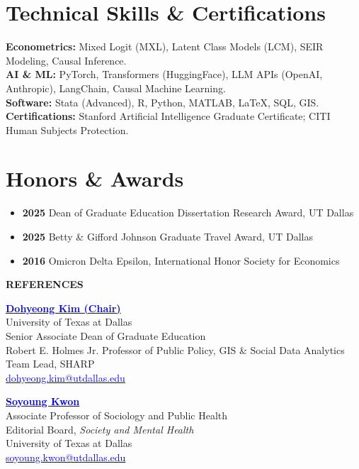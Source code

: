 \documentclass[11pt, letterpaper]{article}
\begin{document}
\section*{Technical Skills \& Certifications}
\textbf{Econometrics:} Mixed Logit (MXL), Latent Class Models (LCM), SEIR Modeling, Causal Inference. \\
\textbf{AI \& ML:} PyTorch, Transformers (HuggingFace), LLM APIs (OpenAI, Anthropic), LangChain, Causal Machine Learning. \\
\textbf{Software:} Stata (Advanced), R, Python, MATLAB, LaTeX, SQL, GIS. \\
\textbf{Certifications:} Stanford Artificial Intelligence Graduate Certificate; CITI Human Subjects Protection.

\section*{Honors \& Awards}
\begin{itemize}[noitemsep, topsep=0pt]
    \item \textbf{2025} Dean of Graduate Education Dissertation Research Award, UT Dallas
    \item \textbf{2025} Betty \& Gifford Johnson Graduate Travel Award, UT Dallas
    \item \textbf{2016} Omicron Delta Epsilon, International Honor Society for Economics
\end{itemize}

\vspace{1em}
\noindent\hrulefill
\begin{center}
    \textbf{REFERENCES}
\end{center}

\begin{minipage}[t]{0.48\textwidth}
    \raggedright
    \textbf{\href{https://profiles.utdallas.edu/dohyeong.kim}{\textcolor{blue}{Dohyeong Kim (Chair)}}} \\
    University of Texas at Dallas \\
    Senior Associate Dean of Graduate Education \\
    Robert E. Holmes Jr. Professor of Public Policy, GIS \& Social Data Analytics \\
    Team Lead, SHARP \\
    \href{mailto:dohyeong.kim@utdallas.edu}{\textcolor{blue}{dohyeong.kim@utdallas.edu}}
\end{minipage}
\hfill
\begin{minipage}[t]{0.48\textwidth}
    \raggedright
    \textbf{\href{https://profiles.utdallas.edu/soyoung.kwon}{\textcolor{blue}{Soyoung Kwon}}} \\
    Associate Professor of Sociology and Public Health \\
    Editorial Board, \textit{Society and Mental Health} \\
    University of Texas at Dallas \\
    \href{mailto:soyoung.kwon@utdallas.edu}{\textcolor{blue}{soyoung.kwon@utdallas.edu}}
\end{minipage}
\end{document}
